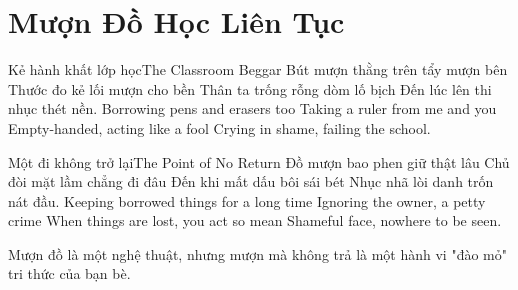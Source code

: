 \chapter{Mượn Đồ Học Liên Tục}

\begin{tutuyetbox}{Kẻ hành khất lớp học}{The Classroom Beggar}
Bút mượn thằng trên tẩy mượn bên
Thước đo kẻ lối mượn cho bền
Thân ta trống rỗng dòm lố bịch
Đến lúc lên thi nhục thét nền.
\tcblower
Borrowing pens and erasers too 
Taking a ruler from me and you 
Empty-handed, acting like a fool 
Crying in shame, failing the school.
\end{tutuyetbox}

\begin{tutuyetbox}{Một đi không trở lại}{The Point of No Return}
Đồ mượn bao phen giữ thật lâu
Chủ đòi mặt lầm chẳng đi đâu
Đến khi mất dấu bôi sái bét
Nhục nhã lòi danh trốn nát đầu.
\tcblower
Keeping borrowed things for a long time 
Ignoring the owner, a petty crime 
When things are lost, you act so mean 
Shameful face, nowhere to be seen.
\end{tutuyetbox}

\begin{ghichu}
Mượn đồ là một nghệ thuật, nhưng mượn mà không trả là một hành vi "đào mỏ" tri thức của bạn bè.
\end{ghichu}